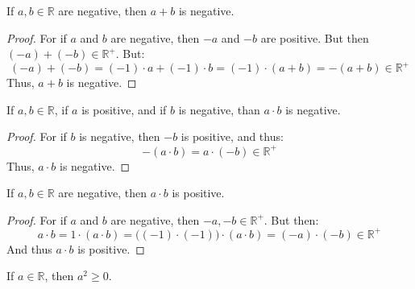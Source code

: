             \begin{theorem}
                If $a,b\in\mathbb{R}$ are negative, then $a+b$ is
                negative.
            \end{theorem}
            \begin{proof}
                For if $a$ and $b$ are negative, then
                $\minus{a}$ and $\minus{b}$ are positive. But then
                $(\minus{a})+(\minus{b})\in\mathbb{R}^{+}$. But:
                \begin{equation}
                    (\minus{a})+(\minus{b})=
                    (\minus{1})\cdot{a}+(\minus{1})\cdot{b}
                    =(\minus{1})\cdot(a+b)
                    =\minus(a+b)\in\mathbb{R}^{+}
                \end{equation}
                Thus, $a+b$ is negative.
            \end{proof}
            \begin{theorem}
                If $a,b\in\mathbb{R}$, if $a$ is positive, and if
                $b$ is negative, than $a\cdot{b}$ is negative.
            \end{theorem}
            \begin{proof}
                For if $b$ is negative, then $\minus{b}$ is
                positive, and thus:
                \begin{equation}
                    \minus(a\cdot{b})
                    =a\cdot(\minus{b})\in\mathbb{R}^{+}
                \end{equation}
                Thus, $a\cdot{b}$ is negative.
            \end{proof}
            \begin{theorem}
                If $a,b\in\mathbb{R}$ are negative, then $a\cdot{b}$
                is positive.
            \end{theorem}
            \begin{proof}
                For if $a$ and $b$ are negative, then
                $\minus{a},\minus{b}\in\mathbb{R}^{+}$. But then:
                \begin{equation}
                    a\cdot{b}=1\cdot(a\cdot{b})
                    =\big((\minus{1})\cdot(\minus{1})\big)
                    \cdot(a\cdot{b})
                    =(\minus{a})\cdot(\minus{b})\in\mathbb{R}^{+}
                \end{equation}
                And thus $a\cdot{b}$ is positive.
            \end{proof}
            \begin{theorem}
                If $a\in\mathbb{R}$, then $a^{2}\geq{0}$.
            \end{theorem}
